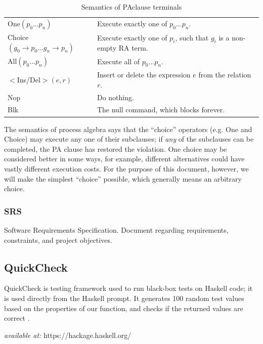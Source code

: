 \documentclass[12pt, svgnames]{article}
\begin{document}
\begin{table}[ht!]\begin{center}\label{tab:PASemantics}
        \caption{Semantics of PAclause terminals}
        \begin{tabularx}{\textwidth}{lX}
            One$(p_0 \ldots p_n)$ & Execute exactly one of $p_0 \ldots p_n$. \\
            Choice$(g_0 \rightarrow p_0 \ldots g_n \rightarrow p_n)$ & Execute 
            exactly
            one of $p_i$, such that $g_i$ is a non-empty RA term. \\
            All$(p_0 \ldots p_n)$ & Execute all of $p_0 \ldots p_n$. \\
            $<$Ins/Del$>(e,r)$ & Insert or delete the expression $e$ from the 
            relation $r$. \\
            Nop & Do nothing. \\
            Blk & The null command, which blocks forever. 
        \end{tabularx}
    \end{center}\end{table}
    
    The semantics of process algebra says that the ``choice'' operators (e.g. 
    One
    and Choice) may execute any one of their subclauses; if \emph{any} of the
    subclauses can be completed, the PA clause has restored the violation.  One
    choice may be considered better in some ways, for example, different
    alternatives could have vastly different execution costs. For the purpose of
    this document, however, we will make the simplest ``choice'' possible, which
    generally means an arbitrary choice. 

\subsubsection*{SRS}
Software Requirements Specification. Document regarding requirements, 
constraints, and project objectives.

\subsection*{QuickCheck}
QuickCheck is testing framework used to run black-box tests on Haskell code; it 
is used directly from the Haskell prompt. It generates 100 random test values 
based on the properties of our function, and checks if the returned values are 
correct \cite{rwhaskell}.

\textit{available at:} https://hackage.haskell.org/
\end{document}
